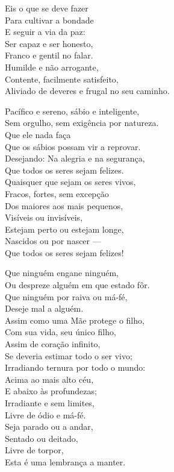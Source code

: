 Eis o que se deve fazer\\
Para cultivar a bondade\\
E seguir a via da paz:\\
Ser capaz e ser honesto,\\
Franco e gentil no falar.\\
Humilde e não arrogante,\\
Contente, facilmente satisfeito,\\
Aliviado de deveres e frugal no seu caminho.

Pacífico e sereno, sábio e inteligente,\\
Sem orgulho, sem exigência por natureza.\\
Que ele nada faça\\
Que os sábios possam vir a reprovar.\\
Desejando: Na alegria e na segurança,\\
Que todos os seres sejam felizes.\\
Quaisquer que sejam os seres vivos,\\
Fracos, fortes, sem excepção\\
Dos maiores aos mais pequenos,\\
Visíveis ou invisíveis,\\
Estejam perto ou estejam longe,\\
Nascidos ou por nascer ---\\
Que todos os seres sejam felizes!

\clearpage

Que ninguém engane ninguém,\\
Ou despreze alguém em que estado fôr.\\
Que ninguém por raiva ou má-fé,\\
Deseje mal a alguém.\\
Assim como uma Mãe protege o filho,\\
Com sua vida, seu único filho,\\
Assim de coração infinito,\\
Se deveria estimar todo o ser vivo;\\
Irradiando ternura por todo o mundo:\\
Acima ao mais alto céu,\\
E abaixo às profundezas;\\
Irradiante e sem limites,\\
Livre de ódio e má-fé.\\
Seja parado ou a andar,\\
Sentado ou deitado,\\
Livre de torpor,\\
Esta é uma lembrança a manter.

